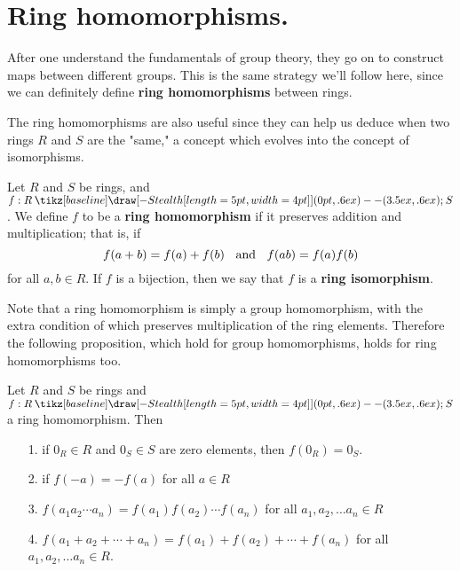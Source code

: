 \documentclass[12pt,letterpaper]{algebra_book}
\renewcommand{\to}{\mathbin{\tikz[baseline] \draw[-{Stealth[length=5pt,width=4pt]}] (0pt,.6ex) -- (3.5ex,.6ex);}}
\theoremstyle{definition}
\begin{document}
    \newpage
    \section{Ring homomorphisms.}
    After one understand the fundamentals of group theory, they go
    on to construct maps between different groups. This is the
    same strategy we'll follow here, since we can definitely
    define \textbf{ring homomorphisms} between rings.

    The ring homomorphisms are also useful since they can help us
    deduce when two rings $R$ and $S$ are the "same," a concept
    which evolves into the concept of isomorphisms.

    \begin{definition}
        Let $R$ and $S$ be rings, and $f:R \to S$. We define $f$
        to be a \textbf{ring homomorphism} if it preserves
        addition and multiplication; that is, if
        \[
            f(a + b) = f(a) + f(b) \hspace{0.2cm}\text{ and }\hspace{0.2cm} 
            f(ab) = f(a)f(b) 
        \]
        for all $a, b \in R$. If $f$ is a bijection, then we say
        that $f$ is a \textbf{ring isomorphism}.
    \end{definition}

    \textcolor{NavyBlue}{Note that a ring homomorphism is simply a
    group homomorphism, with the extra condition of which preserves multiplication of the
    ring elements.} Therefore the following proposition, which
    hold for group homomorphisms, holds for ring homomorphisms
    too. 
    \begin{proposition}
        Let $R$ and $S$ be rings and $f: R \to S$ a ring homomorphism.
        Then 
        \begin{itemize}
            \item[1.] if $0_R \in R$ and $0_S \in S$ are zero
            elements, then $f(0_R) = 0_S$. 

            \item[2.] if $f(-a) = -f(a)$ for all $a \in R$
            \item[3.] $f(a_1a_2\cdots a_n) = f(a_1)f(a_2)\cdots
            f(a_n)$ for all $a_1, a_2, \dots a_n \in R$
            \item[4.] $f(a_1 + a_2 + \cdots + a_n) = f(a_1) +
            f(a_2) + \cdots + f(a_n)$ for all $a_1, a_2, \dots a_n \in R$.
        \end{itemize} 
    \end{proposition}
    
\end{document}
